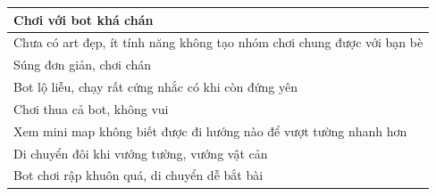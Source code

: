 \documentclass[12pt,a4paper]{article}
\begin{document}
  \begin{table}[H]
    \centering
    \begin{tabular}{|l|}
    \hline
    Chơi với bot khá chán                                                                                                                                                                                                                                                              \\ \hline
    Chưa có art đẹp, ít tính năng không tạo nhóm chơi chung được với bạn bè                                                                                                                                                                                                            \\ \hline
    Súng đơn giản, chơi chán                                                                                                                                                                                                                                                       \\ \hline
    Bot lộ liễu, chạy rất cứng nhắc có khi còn đứng yên                                                                                                                                                                                                                                \\ \hline
    Chơi thua cả bot, không vui                                                                                                                                                                                                                                                               \\ \hline
    Xem mini map không biết được đi hướng nào để vượt tường nhanh hơn                                                                                                                                                                                                                                                              \\ \hline
    Di chuyển đôi khi vướng tường, vướng vật cản                                                                                                                                                                                                                                       \\ \hline
    Bot chơi rập khuôn quá, di chuyển dễ bắt bài                                                                                                                                                                                                                                       \\ \hline

\end{tabular}
\end{table}
\end{document}
